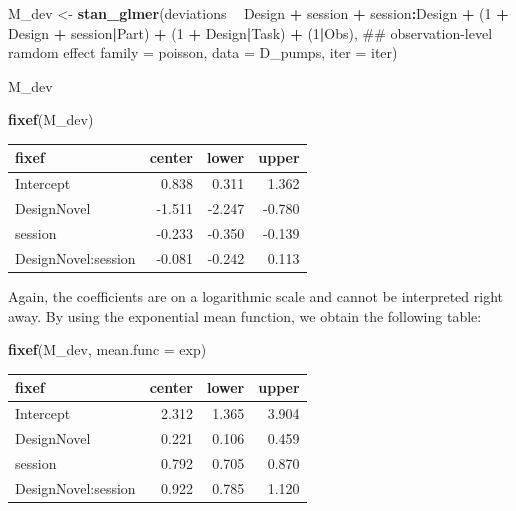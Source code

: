 \documentclass[]{svmono}
\newenvironment{Shaded}{\begin{snugshade}}{\end{snugshade}}
\newcommand{\KeywordTok}[1]{\textcolor[rgb]{0.13,0.29,0.53}{\textbf{#1}}}
\newcommand{\DataTypeTok}[1]{\textcolor[rgb]{0.13,0.29,0.53}{#1}}
\newcommand{\DecValTok}[1]{\textcolor[rgb]{0.00,0.00,0.81}{#1}}
\newcommand{\StringTok}[1]{\textcolor[rgb]{0.31,0.60,0.02}{#1}}
\newcommand{\OperatorTok}[1]{\textcolor[rgb]{0.81,0.36,0.00}{\textbf{#1}}}
\newcommand{\NormalTok}[1]{#1}
\begin{document}
\begin{Shaded}
\begin{Highlighting}[]
\NormalTok{M_dev <-}\StringTok{ }
\StringTok{  }\KeywordTok{stan_glmer}\NormalTok{(deviations }\OperatorTok{~}\StringTok{ }\NormalTok{Design }\OperatorTok{+}\StringTok{ }\NormalTok{session }\OperatorTok{+}\StringTok{ }\NormalTok{session}\OperatorTok{:}\NormalTok{Design }\OperatorTok{+}\StringTok{ }
\StringTok{               }\NormalTok{(}\DecValTok{1} \OperatorTok{+}\StringTok{ }\NormalTok{Design }\OperatorTok{+}\StringTok{ }\NormalTok{session}\OperatorTok{|}\NormalTok{Part) }\OperatorTok{+}
\StringTok{               }\NormalTok{(}\DecValTok{1} \OperatorTok{+}\StringTok{ }\NormalTok{Design}\OperatorTok{|}\NormalTok{Task) }\OperatorTok{+}
\StringTok{               }\NormalTok{(}\DecValTok{1}\OperatorTok{|}\NormalTok{Obs), ## observation-level ramdom effect}
             \DataTypeTok{family =}\NormalTok{ poisson,}
             \DataTypeTok{data =}\NormalTok{ D_pumps, }\DataTypeTok{iter =}\NormalTok{ iter) }

\NormalTok{M_dev}
\end{Highlighting}
\end{Shaded}

\begin{Shaded}
\begin{Highlighting}[]
\KeywordTok{fixef}\NormalTok{(M_dev)}
\end{Highlighting}
\end{Shaded}

\begin{longtable}[]{@{}lrrr@{}}
\toprule
fixef & center & lower & upper\tabularnewline
\midrule
\endhead
Intercept & 0.838 & 0.311 & 1.362\tabularnewline
DesignNovel & -1.511 & -2.247 & -0.780\tabularnewline
session & -0.233 & -0.350 & -0.139\tabularnewline
DesignNovel:session & -0.081 & -0.242 & 0.113\tabularnewline
\bottomrule
\end{longtable}

Again, the coefficients are on a logarithmic scale and cannot be
interpreted right away. By using the exponential mean function, we
obtain the following table:

\begin{Shaded}
\begin{Highlighting}[]
\KeywordTok{fixef}\NormalTok{(M_dev, }\DataTypeTok{mean.func =}\NormalTok{ exp)}
\end{Highlighting}
\end{Shaded}

\begin{longtable}[]{@{}lrrr@{}}
\toprule
fixef & center & lower & upper\tabularnewline
\midrule
\endhead
Intercept & 2.312 & 1.365 & 3.904\tabularnewline
DesignNovel & 0.221 & 0.106 & 0.459\tabularnewline
session & 0.792 & 0.705 & 0.870\tabularnewline
DesignNovel:session & 0.922 & 0.785 & 1.120\tabularnewline
\bottomrule
\end{longtable}
\end{document}
